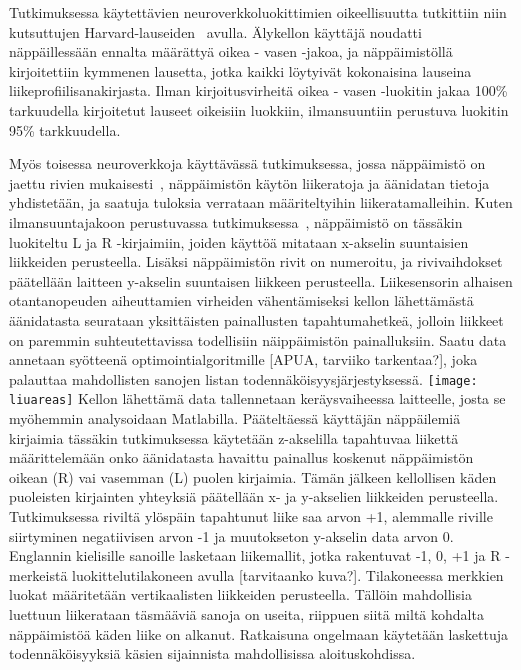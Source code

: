 \documentclass[finnish]{tktltiki2}
\theoremstyle{definition}
\theoremstyle{remark}
\begin{document}
Tutkimuksessa käytettävien neuroverkkoluokittimien oikeellisuutta tutkittiin niin kutsuttujen Harvard-lauseiden~\cite{har} avulla. Älykellon käyttäjä noudatti näppäillessään ennalta määrättyä oikea - vasen -jakoa, ja näppäimistöllä kirjoitettiin kymmenen lausetta, jotka kaikki löytyivät kokonaisina lauseina liikeprofiilisanakirjasta. Ilman kirjoitusvirheitä oikea - vasen -luokitin jakaa 100\% tarkuudella kirjoitetut lauseet oikeisiin luokkiin, ilmansuuntiin perustuva luokitin 95\% tarkkuudella. 

Myös toisessa neuroverkkoja käyttävässä tutkimuksessa, jossa näppäimistö on jaettu rivien mukaisesti~\cite{liu}, näppäimistön käytön liikeratoja ja äänidatan tietoja yhdistetään, ja saatuja tuloksia verrataan määriteltyihin liikeratamalleihin. Kuten ilmansuuntajakoon perustuvassa tutkimuksessa~\cite{maiti}, näppäimistö on tässäkin luokiteltu L ja R -kirjaimiin, joiden käyttöä mitataan x-akselin suuntaisien liikkeiden perusteella. Lisäksi näppäimistön rivit on numeroitu, ja rivivaihdokset päätellään laitteen y-akselin suuntaisen liikkeen perusteella. Liikesensorin alhaisen otantanopeuden aiheuttamien virheiden vähentämiseksi kellon lähettämästä äänidatasta seurataan yksittäisten painallusten tapahtumahetkeä, jolloin liikkeet on paremmin suhteutettavissa todellisiin näippäimistön painalluksiin. Saatu data annetaan syötteenä optimointialgoritmille [APUA, tarviiko tarkentaa?], joka palauttaa mahdollisten sanojen listan todennäköisyysjärjestyksessä. 
\linebreak
\texttt{[image: liuareas]}
\linebreak
Kellon lähettämä data tallennetaan keräysvaiheessa laitteelle, josta se myöhemmin analysoidaan Matlabilla. Pääteltäessä käyttäjän näppäilemiä kirjaimia tässäkin tutkimuksessa käytetään z-akselilla tapahtuvaa liikettä määrittelemään onko äänidatasta havaittu painallus koskenut näppäimistön oikean (R) vai vasemman (L) puolen kirjaimia. Tämän jälkeen kellollisen käden puoleisten kirjainten yhteyksiä päätellään x- ja y-akselien liikkeiden perusteella. Tutkimuksessa riviltä ylöspäin tapahtunut liike saa arvon +1, alemmalle riville siirtyminen negatiivisen arvon -1 ja muutokseton y-akselin data arvon 0. Englannin kielisille sanoille lasketaan liikemallit, jotka rakentuvat -1, 0, +1 ja R -merkeistä luokittelutilakoneen avulla [tarvitaanko kuva?]. Tilakoneessa merkkien luokat määritetään vertikaalisten liikkeiden perusteella. Tällöin mahdollisia luettuun liikerataan täsmääviä sanoja on useita, riippuen siitä miltä kohdalta näppäimistöä käden liike on alkanut. Ratkaisuna ongelmaan käytetään laskettuja todennäköisyyksiä käsien sijainnista mahdollisissa aloituskohdissa.
\end{document}
